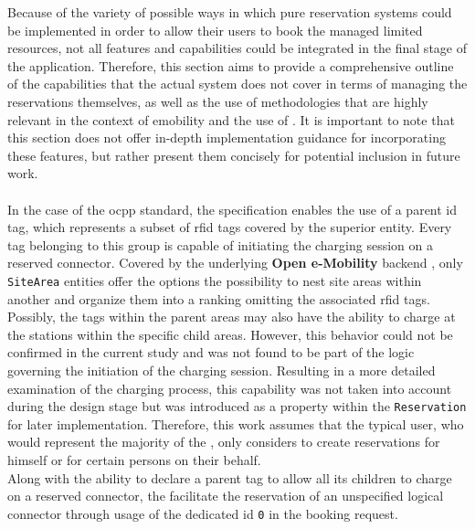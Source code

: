 Because of the variety of possible ways in which pure reservation systems could be implemented in order to allow their users to book the managed limited resources, not all features and capabilities could be integrated in the final stage of the application.
Therefore, this section aims to provide a comprehensive outline of the capabilities that the actual system does not cover in terms of managing the reservations themselves, as well as the use of methodologies that are highly relevant in the context of \acrshort{emobility} and the use of .
It is important to note that this section does not offer in-depth implementation guidance for incorporating these features, but rather present them concisely for potential inclusion in future work. \\ \\
\noindent In the case of the \acrshort{ocpp} standard, the specification enables the use of a parent \acrshort{id} tag, which represents a subset of \acrshort{rfid} tags covered by the superior entity. Every tag belonging to this group is capable of initiating the charging session on a reserved connector.
Covered by the underlying \textbf{Open e-Mobility} backend \cite{noauthor_github_nodate-2}, only \texttt{SiteArea} entities offer the options the possibility to nest site areas within another and organize them into a ranking omitting the associated \acrshort{rfid} tags.
Possibly, the tags within the parent areas may also have the ability to charge at the stations within the specific child areas. However, this behavior could not be confirmed in the current study and was not found to be part of the logic governing the initiation of the charging session.
Resulting in a more detailed examination of the charging process, this capability was not taken into account during the design stage but was introduced as a property within the \texttt{Reservation} for later implementation.
Therefore, this work assumes that the typical user, who would represent the majority of the , only considers to create reservations for himself or for certain persons on their behalf. \\ 
Along with the ability to declare a parent tag to allow all its children to charge on a reserved connector, the  facilitate the reservation of an unspecified logical connector through usage of the dedicated \acrshort{id} \texttt{0} in the booking request.
